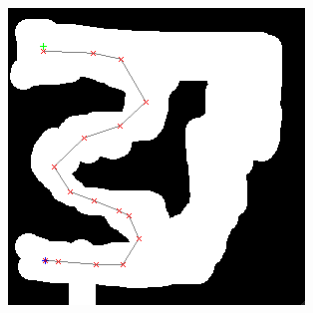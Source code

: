 \begin{figure}[ht]
    \centering
	\includegraphics[width=0.7\textwidth, angle=0]{img/p5.png} 
\end{figure}